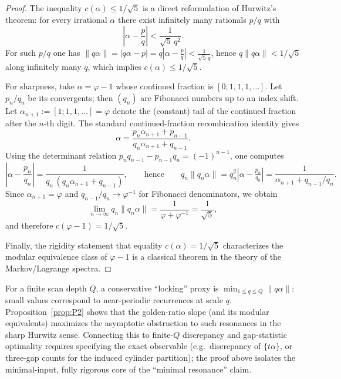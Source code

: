\begin{proof}
The inequality $c(\alpha)\le 1/\sqrt5$ is a direct reformulation of Hurwitz's theorem: for every irrational $\alpha$ there exist infinitely many rationals $p/q$ with
\[
\left|\alpha-\frac{p}{q}\right|<\frac{1}{\sqrt5\,q^2}.
\]
For such $p/q$ one has $\|q\alpha\|=|q\alpha-p|=q\left|\alpha-\tfrac{p}{q}\right|<\tfrac{1}{\sqrt5\,q}$, hence $q\|q\alpha\|<1/\sqrt5$ along infinitely many $q$, which implies $c(\alpha)\le 1/\sqrt5$.
\cite{Cassels1957DiophantineApproximation,Khinchin1964ContinuedFractions}

For sharpness, take $\alpha=\varphi-1$ whose continued fraction is $[0;1,1,1,\dots]$.
Let $p_n/q_n$ be its convergents; then $(q_n)$ are Fibonacci numbers up to an index shift.
Let $\alpha_{n+1}:=[1;1,1,\dots]=\varphi$ denote the (constant) tail of the continued fraction after the $n$-th digit.
The standard continued-fraction recombination identity gives
\[
\alpha=\frac{p_n\alpha_{n+1}+p_{n-1}}{q_n\alpha_{n+1}+q_{n-1}}.
\]
Using the determinant relation $p_n q_{n-1}-p_{n-1}q_n = (-1)^{n-1}$, one computes
\[
\left|\alpha-\frac{p_n}{q_n}\right|
=\frac{1}{q_n\,(q_n\alpha_{n+1}+q_{n-1})},
\qquad\text{hence}\qquad
q_n\|q_n\alpha\|
=q_n^2\left|\alpha-\tfrac{p_n}{q_n}\right|
=\frac{1}{\alpha_{n+1}+q_{n-1}/q_n}.
\]
Since $\alpha_{n+1}=\varphi$ and $q_{n-1}/q_n\to \varphi^{-1}$ for Fibonacci denominators, we obtain
\[
\lim_{n\to\infty} q_n\|q_n\alpha\|
=\frac{1}{\varphi+\varphi^{-1}}
=\frac{1}{\sqrt5},
\]
and therefore $c(\varphi-1)=1/\sqrt5$.
\cite{Khinchin1964ContinuedFractions}

Finally, the rigidity statement that equality $c(\alpha)=1/\sqrt5$ characterizes the modular equivalence class of $\varphi-1$ is a classical theorem in the theory of the Markov/Lagrange spectra.\cite{CusickFlahive1989MarkovLagrangeSpectra}
\end{proof}

\begin{remark}
For a finite scan depth $Q$, a conservative ``locking'' proxy is $\min_{1\le q\le Q}\|q\alpha\|$: small values correspond to near-periodic recurrences at scale $q$.
Proposition~\ref{prop:P2} shows that the golden-ratio slope (and its modular equivalents) maximizes the asymptotic obstruction to such resonances in the sharp Hurwitz sense.
Connecting this to finite-$Q$ discrepancy and gap-statistic optimality requires specifying the exact observable (e.g.\ discrepancy of $\{t\alpha\}$, or three-gap counts for the induced cylinder partition); the proof above isolates the minimal-input, fully rigorous core of the ``minimal resonance'' claim.
\end{remark}

